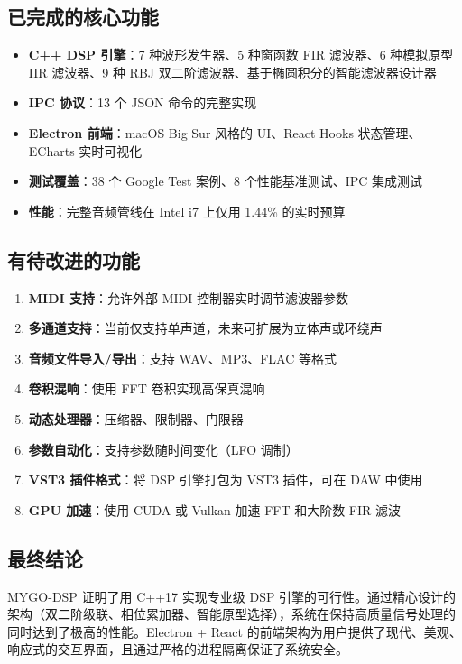 ﻿\documentclass[12pt,a4paper,oneside]{ctexbook}
\begin{document}
\subsection{已完成的核心功能}

\begin{itemize}
    \item \textbf{C++ DSP 引擎}：7 种波形发生器、5 种窗函数 FIR 滤波器、6 种模拟原型 IIR 滤波器、9 种 RBJ 双二阶滤波器、基于椭圆积分的智能滤波器设计器
    \item \textbf{IPC 协议}：13 个 JSON 命令的完整实现
    \item \textbf{Electron 前端}：macOS Big Sur 风格的 UI、React Hooks 状态管理、ECharts 实时可视化
    \item \textbf{测试覆盖}：38 个 Google Test 案例、8 个性能基准测试、IPC 集成测试
    \item \textbf{性能}：完整音频管线在 Intel i7 上仅用 1.44\% 的实时预算
\end{itemize}

\subsection{有待改进的功能}

\begin{enumerate}
    \item \textbf{MIDI 支持}：允许外部 MIDI 控制器实时调节滤波器参数
    \item \textbf{多通道支持}：当前仅支持单声道，未来可扩展为立体声或环绕声
    \item \textbf{音频文件导入/导出}：支持 WAV、MP3、FLAC 等格式
    \item \textbf{卷积混响}：使用 FFT 卷积实现高保真混响
    \item \textbf{动态处理器}：压缩器、限制器、门限器
    \item \textbf{参数自动化}：支持参数随时间变化（LFO 调制）
    \item \textbf{VST3 插件格式}：将 DSP 引擎打包为 VST3 插件，可在 DAW 中使用
    \item \textbf{GPU 加速}：使用 CUDA 或 Vulkan 加速 FFT 和大阶数 FIR 滤波
\end{enumerate}

\subsection{最终结论}

MYGO-DSP 证明了用 C++17 实现专业级 DSP 引擎的可行性。通过精心设计的架构（双二阶级联、相位累加器、智能原型选择），系统在保持高质量信号处理的同时达到了极高的性能。Electron + React 的前端架构为用户提供了现代、美观、响应式的交互界面，且通过严格的进程隔离保证了系统安全。
\end{document}
